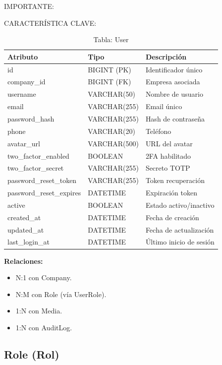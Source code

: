 \documentclass[12pt,a4paper,oneside]{book}
\begin{document}
\begin{alert}{IMPORTANTE:}
\begin{info}{CARACTERÍSTICA CLAVE:}
\begin{table}[ht]
    \centering
    \caption{Tabla: User}
    \begin{tabular}{@{}lll@{}}
        \toprule
        \textbf{Atributo} & \textbf{Tipo} & \textbf{Descripción} \\
        \midrule
        id & BIGINT (PK) & Identificador único \\
        company\_id & BIGINT (FK) & Empresa asociada \\
        username & VARCHAR(50) & Nombre de usuario \\
        email & VARCHAR(255) & Email único \\
        password\_hash & VARCHAR(255) & Hash de contraseña \\
        phone & VARCHAR(20) & Teléfono \\
        avatar\_url & VARCHAR(500) & URL del avatar \\
        two\_factor\_enabled & BOOLEAN & 2FA habilitado \\
        two\_factor\_secret & VARCHAR(255) & Secreto TOTP \\
        password\_reset\_token & VARCHAR(255) & Token recuperación \\
        password\_reset\_expires & DATETIME & Expiración token \\
        active & BOOLEAN & Estado activo/inactivo \\
        created\_at & DATETIME & Fecha de creación \\
        updated\_at & DATETIME & Fecha de actualización \\
        last\_login\_at & DATETIME & Último inicio de sesión \\
        \bottomrule
    \end{tabular}
\end{table}

\textbf{Relaciones:}
\begin{itemize}
    \item N:1 con Company.
    \item N:M con Role (vía UserRole).
    \item 1:N con Media.
    \item 1:N con AuditLog.
\end{itemize}

\subsection{Role (Rol)}
\label{sec:role}


\end{info}
\end{alert}
\end{document}
